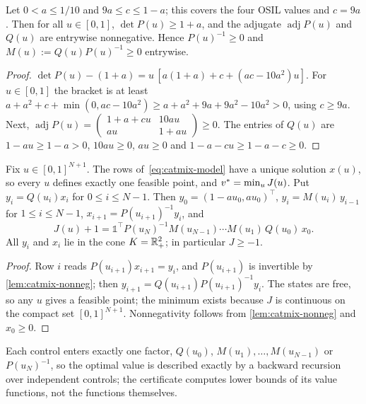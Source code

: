 \begin{lemma}[nonnegativity]\label{lem:catmix-nonneg}
Let $0 < a \le 1/10$ and $9a \le c \le 1 - a$; this covers the four OSIL values and $c = 9a$.
Then for all $u \in [0,1]$, $\det P(u) \ge 1 + a$, and the adjugate $\operatorname{adj}P(u)$ and $Q(u)$ are entrywise nonnegative.
Hence $P(u)^{-1} \ge 0$ and $M(u) := Q(u)P(u)^{-1} \ge 0$ entrywise.
\end{lemma}

\begin{proof}
$\det P(u) - (1+a) = u\,[a(1+a) + c + (ac - 10a^2)u]$.
For $u \in [0,1]$ the bracket is at least $a + a^2 + c + \min(0, ac - 10a^2) \ge a + a^2 + 9a + 9a^2 - 10a^2 > 0$, using $c \ge 9a$.
Next, $\operatorname{adj}P(u) = \begin{pmatrix} 1 + a + c u & 10 a u\\ a u & 1 + a u\end{pmatrix} \ge 0$.
The entries of $Q(u)$ are $1 - au \ge 1 - a > 0$, $10au \ge 0$, $au \ge 0$ and $1 - a - cu \ge 1 - a - c \ge 0$.
\end{proof}

\begin{lemma}\label{lem:catmix-reduction}
Fix $u \in [0,1]^{N+1}$.
The rows of~\eqref{eq:catmix-model} have a unique solution $x(u)$, so every $u$ defines exactly one feasible point, and $v^{*} = \min_u J(u)$.
Put $y_i = Q(u_i)x_i$ for $0 \le i \le N-1$.
Then $y_0 = (1 - au_0, au_0)^\top$, $y_i = M(u_i)\,y_{i-1}$ for $1 \le i \le N-1$, $x_{i+1} = P(u_{i+1})^{-1}y_i$, and
\[
J(u) + 1 = \mathbb{1}^\top P(u_N)^{-1} M(u_{N-1}) \cdots M(u_1)\, Q(u_0)\, x_0 .
\]
All $y_i$ and $x_i$ lie in the cone $K = \mathbb{R}^2_+$; in particular $J \ge -1$.
\end{lemma}

\begin{proof}
Row $i$ reads $P(u_{i+1})x_{i+1} = y_i$, and $P(u_{i+1})$ is invertible by \cref{lem:catmix-nonneg}; then $y_{i+1} = Q(u_{i+1})P(u_{i+1})^{-1}y_i$.
The states are free, so any $u$ gives a feasible point; the minimum exists because $J$ is continuous on the compact set $[0,1]^{N+1}$.
Nonnegativity follows from \cref{lem:catmix-nonneg} and $x_0 \ge 0$.
\end{proof}

Each control enters exactly one factor, $Q(u_0)$, $M(u_1), \dots, M(u_{N-1})$ or $P(u_N)^{-1}$, so the optimal value is described exactly by a backward recursion over independent controls; the certificate computes lower bounds of its value functions, not the functions themselves.

